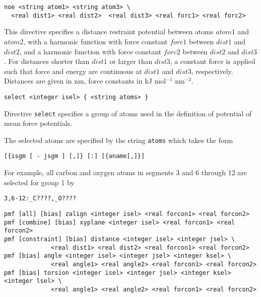 \begin{verbatim}
noe <string atom1> <string atom3> \
  <real dist1> <real dist2>  <real dist3> <real forc1> <real forc2>
\end{verbatim}

This directive specifies a distance restraint potential between atoms
$atom1$ and $atom2$, with a harmonic function with force constant
$forc1$ between $dist1$ and $dist2$, and a harmonic function with 
force constant $forc2$ between $dist2$ and $dist3$. For distances
shorter than $dist1$ or larger than $dist3$, a constant force is 
applied such that force and energy are continuous at $dist1$
and $dist3$, respectively. Distances are given in nm, force constants
in kJ mol$^{-1}$ nm$^{-2}$.

\begin{verbatim}
select <integer isel> { <string atoms> }
\end{verbatim}

Directive \verb+select+ specifies a group of atoms used in the
definition of potential of mean force potentials.

The selected atoms are specified by the string \verb+atoms+ which
takes the form

\begin{verbatim}
[{isgm [ - jsgm ] [,]} [:] [{aname[,]}]
\end{verbatim}

For example, all carbon and oxygen atoms in segments 3
and 6 through 12 are selected for group 1 by

\begin{verbatim}
3,6-12:_C????,_O????
\end{verbatim}

\begin{verbatim}
pmf [all] [bias] zalign <integer isel> <real forcon1> <real forcon2> 
pmf [combine] [bias] xyplane <integer isel> <real forcon1> <real forcon2>
pmf [constraint] [bias] distance <integer isel> <integer jsel> \
             <real dist1> <real dist2> <real forcon1> <real forcon2>
pmf [bias] angle <integer isel> <integer jsel> <integer ksel> \
             <real angle1> <real angle2> <real forcon1> <real forcon2>
pmf [bias] torsion <integer isel> <integer jsel> <integer ksel> <integer lsel> \
             <real angle1> <real angle2> <real forcon1> <real forcon2>
\end{verbatim}

